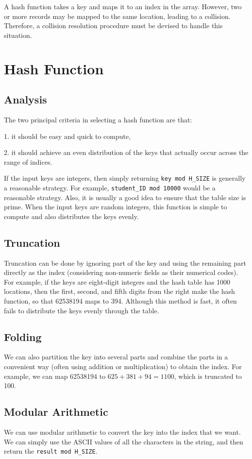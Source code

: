 A hash function takes a key and maps it to an index in the array. However, two or more records may be mapped to the same location, leading to a collision. Therefore, a collision resolution procedure must be devised to handle this situation.

\section{Hash Function}
\subsection{Analysis}
The two principal criteria in selecting a hash function are that:

1. it should be easy and quick to compute,

2. it should achieve an even distribution of the keys that actually occur across the range of indices.

If the input keys are integers, then simply returning \verb|key mod H_SIZE| is generally a reasonable strategy. For example, \verb|student_ID mod 10000| would be a reasonable strategy. Also, it is usually a good idea to ensure that the table size is prime. When the input keys are random integers, this function is simple to compute and also distributes the keys evenly.

\subsection{Truncation}
Truncation can be done by ignoring part of the key and using the remaining part directly as the index (considering non-numeric fields as their numerical codes). For example, if the keys are eight-digit integers and the hash table has 1000 locations, then the first, second, and fifth digits from the right make the hash function, so that 62538194 maps to 394. Although this method is fast, it often fails to distribute the keys evenly through the table.

\subsection{Folding}
We can also partition the key into several parts and combine the parts in a convenient way (often using addition or multiplication) to obtain the index. For example, we can map 62538194 to \(625 + 381 + 94 = 1100\), which is truncated to 100.

\subsection{Modular Arithmetic}
We can use modular arithmetic to convert the key into the index that we want. We can simply use the ASCII values of all the characters in the string, and then return the \verb|result mod H_SIZE|. 


